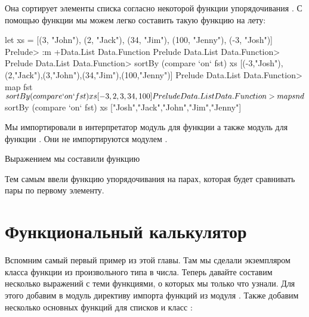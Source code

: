 Она сортирует элементы списка согласно некоторой
функции упорядочивания .
С помощью функции  мы можем легко составить такую
функцию на лету:

\begin{code}
let xs = [(3, "John"), (2, "Jack"), (34, "Jim"), (100, "Jenny"), (-3, "Josh")]  
Prelude> :m +Data.List Data.Function
Prelude Data.List Data.Function> 
Prelude Data.List Data.Function> sortBy (compare `on` fst) xs
[(-3,"Josh"),(2,"Jack"),(3,"John"),(34,"Jim"),(100,"Jenny")]
Prelude Data.List Data.Function> map fst $ sortBy (compare `on` fst) xs
[-3,2,3,34,100]
Prelude Data.List Data.Function> map snd $ sortBy (compare `on` fst) xs
["Josh","Jack","John","Jim","Jenny"]
\end{code}

Мы импортировали в интерпретатор модуль  для функции
 а также модуль  для функции .
Они не импортируются модулем .

Выражением  мы составили функцию 


Тем самым ввели функцию упорядочивания на парах, которая 
будет сравнивать пары по первому элементу.

\section{Функциональный калькулятор}

Вспомним самый первый пример из этой главы. Там мы сделали 
экземпляром класса  функции из произвольного типа
в числа. Теперь давайте составим несколько выражений 
с теми функциями, о которых мы только что узнали.
Для этого добавим в модуль  директиву импорта
функций из модуля . Также добавим несколько
основных функций для списков и класс :


